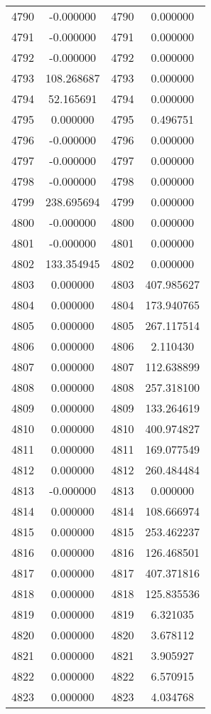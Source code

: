 \documentclass[12pt]{article}
\begin{document}
\begin{longtable}{@{}cccc@{}}
4790 & -0.000000 & 4790 & 0.000000 \\
4791 & -0.000000 & 4791 & 0.000000 \\
4792 & -0.000000 & 4792 & 0.000000 \\
4793 & 108.268687 & 4793 & 0.000000 \\
4794 & 52.165691 & 4794 & 0.000000 \\
4795 & 0.000000 & 4795 & 0.496751 \\
4796 & -0.000000 & 4796 & 0.000000 \\
4797 & -0.000000 & 4797 & 0.000000 \\
4798 & -0.000000 & 4798 & 0.000000 \\
4799 & 238.695694 & 4799 & 0.000000 \\
4800 & -0.000000 & 4800 & 0.000000 \\
4801 & -0.000000 & 4801 & 0.000000 \\
4802 & 133.354945 & 4802 & 0.000000 \\
4803 & 0.000000 & 4803 & 407.985627 \\
4804 & 0.000000 & 4804 & 173.940765 \\
4805 & 0.000000 & 4805 & 267.117514 \\
4806 & 0.000000 & 4806 & 2.110430 \\
4807 & 0.000000 & 4807 & 112.638899 \\
4808 & 0.000000 & 4808 & 257.318100 \\
4809 & 0.000000 & 4809 & 133.264619 \\
4810 & 0.000000 & 4810 & 400.974827 \\
4811 & 0.000000 & 4811 & 169.077549 \\
4812 & 0.000000 & 4812 & 260.484484 \\
4813 & -0.000000 & 4813 & 0.000000 \\
4814 & 0.000000 & 4814 & 108.666974 \\
4815 & 0.000000 & 4815 & 253.462237 \\
4816 & 0.000000 & 4816 & 126.468501 \\
4817 & 0.000000 & 4817 & 407.371816 \\
4818 & 0.000000 & 4818 & 125.835536 \\
4819 & 0.000000 & 4819 & 6.321035 \\
4820 & 0.000000 & 4820 & 3.678112 \\
4821 & 0.000000 & 4821 & 3.905927 \\
4822 & 0.000000 & 4822 & 6.570915 \\
4823 & 0.000000 & 4823 & 4.034768 \\

\end{longtable}
\end{document}
